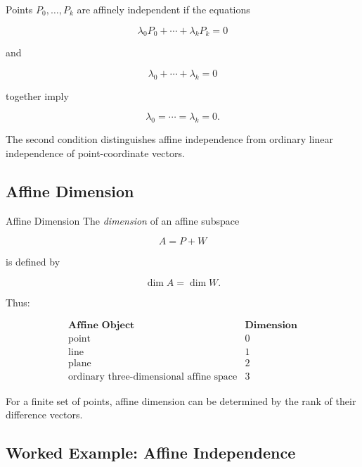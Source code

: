 Points \(P_0,\ldots,P_k\) are affinely independent if the equations

\[
\lambda_0P_0+\cdots+\lambda_kP_k=0
\]

and

\[
\lambda_0+\cdots+\lambda_k=0
\]

together imply

\[ \lambda_0=\cdots=\lambda_k=0. \]

The second condition distinguishes affine independence from ordinary linear
independence of point-coordinate vectors.

\subsection{Affine Dimension}
\label{subsec:affine-dimension}

\begin{definitionbox}{Affine Dimension}
The \emph{dimension} of an affine subspace

\[ A=P+W \]

is defined by

\[ \boxed{\dim A=\dim W.} \]
\end{definitionbox}

Thus:

\[
\begin{array}{c|c}
\textbf{Affine Object} & \textbf{Dimension}\\
\hline
\text{point} & 0\\
\text{line} & 1\\
\text{plane} & 2\\
\text{ordinary three-dimensional affine space} & 3
\end{array}
\]

For a finite set of points, affine dimension can be determined by the rank
of their difference vectors.

\subsection{Worked Example: Affine Independence}
\label{subsec:worked-affine-independence}

